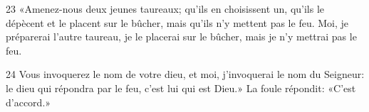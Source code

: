 
23 «Amenez-nous deux jeunes taureaux; qu’ils en choisissent un, qu’ils le dépècent et le placent sur le bûcher, mais qu’ils n’y mettent pas le feu. Moi, je préparerai l’autre taureau, je le placerai sur le bûcher, mais je n’y mettrai pas le feu.

24 Vous invoquerez le nom de votre dieu, et moi, j’invoquerai le nom du Seigneur: le dieu qui répondra par le feu, c’est lui qui est Dieu.» La foule répondit: «C’est d’accord.»
